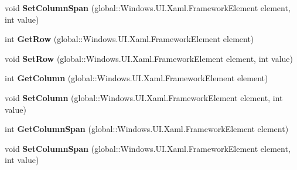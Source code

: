 \begin{DoxyCompactItemize}
\item 
\mbox{\label{interface_windows_1_1_u_i_1_1_xaml_1_1_controls_1_1_i_grid_statics_ac9860a85b2ffd6bee23d564be6744824}} 
void {\bfseries Set\+Column\+Span} (global\+::\+Windows.\+U\+I.\+Xaml.\+Framework\+Element element, int value)
\item 
\mbox{\label{interface_windows_1_1_u_i_1_1_xaml_1_1_controls_1_1_i_grid_statics_a7cab98248e8823c599dc35102ff746c5}} 
int {\bfseries Get\+Row} (global\+::\+Windows.\+U\+I.\+Xaml.\+Framework\+Element element)
\item 
\mbox{\label{interface_windows_1_1_u_i_1_1_xaml_1_1_controls_1_1_i_grid_statics_a74203a6ea6e2a26830dd353da361789f}} 
void {\bfseries Set\+Row} (global\+::\+Windows.\+U\+I.\+Xaml.\+Framework\+Element element, int value)
\item 
\mbox{\label{interface_windows_1_1_u_i_1_1_xaml_1_1_controls_1_1_i_grid_statics_a5669711d053518b49290b7556a8ba584}} 
int {\bfseries Get\+Column} (global\+::\+Windows.\+U\+I.\+Xaml.\+Framework\+Element element)
\item 
\mbox{\label{interface_windows_1_1_u_i_1_1_xaml_1_1_controls_1_1_i_grid_statics_a73679f372e5c95be6df634924e36dc2c}} 
void {\bfseries Set\+Column} (global\+::\+Windows.\+U\+I.\+Xaml.\+Framework\+Element element, int value)
\item 
\mbox{\label{interface_windows_1_1_u_i_1_1_xaml_1_1_controls_1_1_i_grid_statics_aeb5b4c961c8bdfd7fb2625d5ae893664}} 
int {\bfseries Get\+Column\+Span} (global\+::\+Windows.\+U\+I.\+Xaml.\+Framework\+Element element)
\item 
\mbox{\label{interface_windows_1_1_u_i_1_1_xaml_1_1_controls_1_1_i_grid_statics_ac9860a85b2ffd6bee23d564be6744824}} 
void {\bfseries Set\+Column\+Span} (global\+::\+Windows.\+U\+I.\+Xaml.\+Framework\+Element element, int value)

\end{DoxyCompactItemize}
